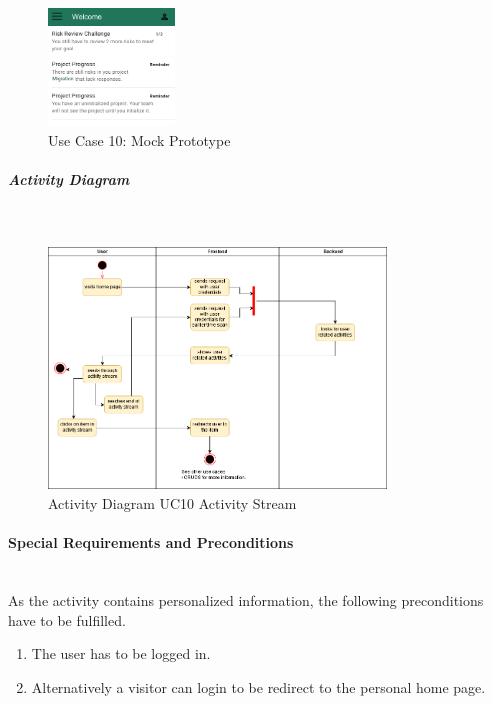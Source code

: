 \begin{figure}[H]
	\centering
	\includegraphics[width=0.3\textwidth]{Assets/UC_Screenshots/UC10S.png}
	\caption{Use Case 10: Mock Prototype}
	\label{fig:useCase10Detail}
\end{figure}
\newpage
\subparagraph{Activity Diagram}\mbox{}\\
\begin{figure}[H]
	\centering
	\includegraphics[width=0.8\textwidth]{Content/Domain/UC10ActivityStream.png}
	\caption{Activity Diagram \ac{UC}10 Activity Stream}
	\label{fig:label11}
\end{figure}

\paragraph*{Special Requirements and Preconditions}\mbox{}\\
As the activity contains personalized information, the following preconditions have to be fulfilled.
\begin{enumerate}
	\vspace{-3mm}
	\setlength\itemsep{-1em}
	\item The user has to be logged in.
	\item Alternatively a visitor can login to be redirect to the personal home page.
\end{enumerate}

